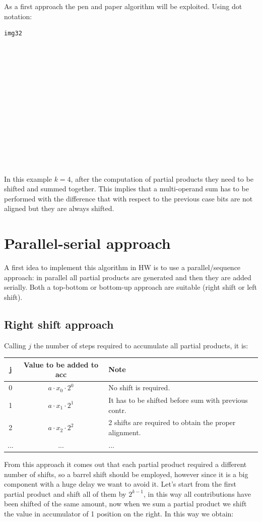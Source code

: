 As a first approach the pen and paper algorithm will be exploited. Using dot notation:
\begin{verbatim}
img32














\end{verbatim}

In this example $k=4$, after the computation of partial products they need to be shifted and summed together. This implies that a multi-operand sum has to be performed with the difference that with respect to the previous case bits are not aligned but they are always shifted.


\section{Parallel-serial approach}
A first idea to implement this algorithm in HW is to use a parallel/sequence approach: in parallel  all partial products are generated and then they are added serially. Both a top-bottom or bottom-up approach are suitable (right shift or left shift).

\subsection{Right shift approach}
Calling $j$ the number of steps required to accumulate all partial products, it is:

\begin{center}
  \begin{tabular}{|c|c|l|}
    \hline
    j&  Value to be added to acc& Note\\
    \hline
    0&    $a \cdot x_0 \cdot 2^0$&  No shift is required.\\
    1&    $a \cdot x_1 \cdot 2^1$&  It has to be shifted before sum with previous contr.\\
    2&    $a \cdot x_2 \cdot 2^2$&  2 shifts are required to obtain the proper alignment.\\
    ...& ...& ...\\
    \hline
  \end{tabular}
\end{center}

From this approach it comes out that each partial product required a different number of shifts, so a barrel shift should be employed, however since it is a big component with a huge delay we want to avoid it. Let's start from the first partial product and shift all of them by $2^{k-1}$, in this way all contributions have been shifted of the same amount, now when we sum a partial product we shift the value in accumulator of 1 position on the right. In this way we obtain:

